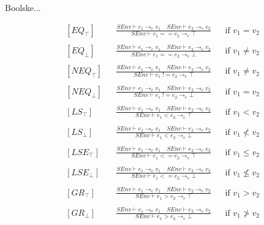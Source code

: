 \noindent Boolske...

\begin{align*}
&[EQ_\top] & &\frac{SEnv \vdash e_1 \rightarrow_e v_1 \quad SEnv \vdash e_2 \rightarrow_e v_2}{SEnv \vdash e_1 == e_2 \rightarrow_e \top} & &\text{if } v_1 = v_2\\\\
&[EQ_\bot] & &\frac{SEnv \vdash e_1 \rightarrow_e v_1 \quad SEnv \vdash e_2 \rightarrow_e v_2}{SEnv \vdash e_1 == e_2 \rightarrow_e \bot} & &\text{if } v_1 \ne v_2\\\\
&[NEQ_\top] & &\frac{SEnv \vdash e_1 \rightarrow_e v_1 \quad SEnv \vdash e_2 \rightarrow_e v_2}{SEnv \vdash e_1\; != e_2 \rightarrow_e \top} & &\text{if } v_1 \ne v_2\\\\
&[NEQ_\bot] & &\frac{SEnv \vdash e_1 \rightarrow_e v_1 \quad SEnv \vdash e_2 \rightarrow_e v_2}{SEnv \vdash e_1\; != e_2 \rightarrow_e \bot} & &\text{if } v_1 = v_2\\\\
&[LS_\top] & &\frac{SEnv \vdash e_1 \rightarrow_e v_1 \quad SEnv \vdash e_2 \rightarrow_e v_2}{SEnv \vdash e_1 < e_2 \rightarrow_e \top} & &\text{if } v_1 < v_2\\\\
&[LS_\bot] & &\frac{SEnv \vdash e_1 \rightarrow_e v_1 \quad SEnv \vdash e_2 \rightarrow_e v_2}{SEnv \vdash e_1 < e_2 \rightarrow_e \bot} & &\text{if } v_1 \nless v_2\\\\
&[LSE_\top] & &\frac{SEnv \vdash e_1 \rightarrow_e v_1 \quad SEnv \vdash e_2 \rightarrow_e v_2}{SEnv \vdash e_1 <= e_2 \rightarrow_e \top} & &\text{if } v_1 \leq v_2\\\\
&[LSE_\bot] & &\frac{SEnv \vdash e_1 \rightarrow_e v_1 \quad SEnv \vdash e_2 \rightarrow_e v_2}{SEnv \vdash e_1 <= e_2 \rightarrow_e \bot} & &\text{if } v_1 \nleq v_2\\\\
&[GR_\top] & &\frac{SEnv \vdash e_1 \rightarrow_e v_1 \quad SEnv \vdash e_2 \rightarrow_e v_2}{SEnv \vdash e_1 > e_2 \rightarrow_e \top} & &\text{if } v_1 > v_2\\\\
&[GR_\bot] & &\frac{SEnv \vdash e_1 \rightarrow_e v_1 \quad SEnv \vdash e_2 \rightarrow_e v_2}{SEnv \vdash e_1 > e_2 \rightarrow_e \bot} & &\text{if } v_1 \ngtr v_2\\\\

\end{align*}
